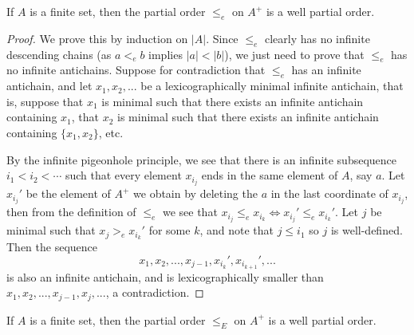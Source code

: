 \documentclass[letterpaper,11pt]{article}
\begin{document}
\begin{thm} If $A$ is a finite set, then the partial order $\le_e$ on $A^+$ is a well partial order.
\end{thm}
\begin{proof} We prove this by induction on $|A|$. Since $\le_e$ clearly has no infinite descending chains (as $a <_e b$ implies $|a| < |b|$), we just need to prove that $\le_e$ has no infinite antichains. Suppose for contradiction that $\le_e$ has an infinite antichain, and let $x_1, x_2, ...$ be a lexicographically minimal infinite antichain, that is, suppose that $x_1$ is minimal such that there exists an infinite antichain containing $x_1$, that $x_2$ is minimal such that there exists an infinite antichain containing $\{x_1, x_2\}$, etc.

By the infinite pigeonhole principle, we see that there is an infinite subsequence $i_1 < i_2 < \cdots$ such that every element $x_{i_j}$ ends in the same element of $A$, say $a$. Let $x_{i_j}'$ be the element of $A^+$ we obtain by deleting the $a$ in the last coordinate of $x_{i_j}$, then from the definition of $\le_e$ we see that $x_{i_j} \le_e x_{i_k} \iff x_{i_j}' \le_e x_{i_k}'$. Let $j$ be minimal such that $x_j >_e x_{i_k}'$ for some $k$, and note that $j \le i_1$ so $j$ is well-defined. Then the sequence
\[
x_1, x_2, ..., x_{j-1}, x_{i_k}', x_{i_{k+1}}', ...
\]
is also an infinite antichain, and is lexicographically smaller than $x_1, x_2, ..., x_{j-1}, x_j, ...$, a contradiction.
\end{proof}

\begin{cor} If $A$ is a finite set, then the partial order $\le_E$ on $A^+$ is a well partial order.
\end{cor}
\end{document}
